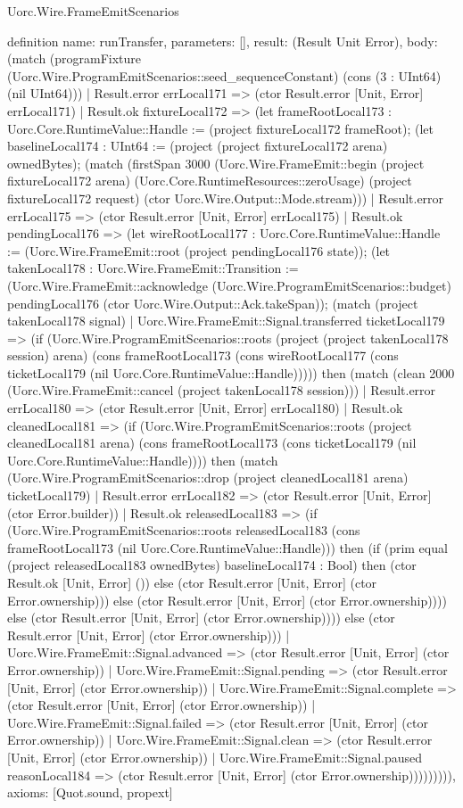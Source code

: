 \begin{lexlean}{Uorc.Wire.FrameEmitScenarios}
\begin{semanticmodule}
definition{
  name: runTransfer,
  parameters: [],
  result: (Result Unit Error),
  body: (match (programFixture (Uorc.Wire.ProgramEmitScenarios::seed_sequenceConstant) (cons (3 : UInt64) (nil UInt64)))
    | Result.error errLocal171 => (ctor Result.error [Unit, Error] errLocal171)
    | Result.ok fixtureLocal172 => (let frameRootLocal173 : Uorc.Core.RuntimeValue::Handle := (project fixtureLocal172 frameRoot); (let baselineLocal174 : UInt64 := (project (project fixtureLocal172 arena) ownedBytes); (match (firstSpan 3000 (Uorc.Wire.FrameEmit::begin (project fixtureLocal172 arena) (Uorc.Core.RuntimeResources::zeroUsage) (project fixtureLocal172 request) (ctor Uorc.Wire.Output::Mode.stream)))
      | Result.error errLocal175 => (ctor Result.error [Unit, Error] errLocal175)
      | Result.ok pendingLocal176 => (let wireRootLocal177 : Uorc.Core.RuntimeValue::Handle := (Uorc.Wire.FrameEmit::root (project pendingLocal176 state)); (let takenLocal178 : Uorc.Wire.FrameEmit::Transition := (Uorc.Wire.FrameEmit::acknowledge (Uorc.Wire.ProgramEmitScenarios::budget) pendingLocal176 (ctor Uorc.Wire.Output::Ack.takeSpan)); (match (project takenLocal178 signal)
        | Uorc.Wire.FrameEmit::Signal.transferred ticketLocal179 => (if (Uorc.Wire.ProgramEmitScenarios::roots (project (project takenLocal178 session) arena) (cons frameRootLocal173 (cons wireRootLocal177 (cons ticketLocal179 (nil Uorc.Core.RuntimeValue::Handle))))) then (match (clean 2000 (Uorc.Wire.FrameEmit::cancel (project takenLocal178 session)))
          | Result.error errLocal180 => (ctor Result.error [Unit, Error] errLocal180)
          | Result.ok cleanedLocal181 => (if (Uorc.Wire.ProgramEmitScenarios::roots (project cleanedLocal181 arena) (cons frameRootLocal173 (cons ticketLocal179 (nil Uorc.Core.RuntimeValue::Handle)))) then (match (Uorc.Wire.ProgramEmitScenarios::drop (project cleanedLocal181 arena) ticketLocal179)
            | Result.error errLocal182 => (ctor Result.error [Unit, Error] (ctor Error.builder))
            | Result.ok releasedLocal183 => (if (Uorc.Wire.ProgramEmitScenarios::roots releasedLocal183 (cons frameRootLocal173 (nil Uorc.Core.RuntimeValue::Handle))) then (if (prim equal (project releasedLocal183 ownedBytes) baselineLocal174 : Bool) then (ctor Result.ok [Unit, Error] ()) else (ctor Result.error [Unit, Error] (ctor Error.ownership))) else (ctor Result.error [Unit, Error] (ctor Error.ownership)))) else (ctor Result.error [Unit, Error] (ctor Error.ownership)))) else (ctor Result.error [Unit, Error] (ctor Error.ownership)))
        | Uorc.Wire.FrameEmit::Signal.advanced => (ctor Result.error [Unit, Error] (ctor Error.ownership))
        | Uorc.Wire.FrameEmit::Signal.pending => (ctor Result.error [Unit, Error] (ctor Error.ownership))
        | Uorc.Wire.FrameEmit::Signal.complete => (ctor Result.error [Unit, Error] (ctor Error.ownership))
        | Uorc.Wire.FrameEmit::Signal.failed => (ctor Result.error [Unit, Error] (ctor Error.ownership))
        | Uorc.Wire.FrameEmit::Signal.clean => (ctor Result.error [Unit, Error] (ctor Error.ownership))
        | Uorc.Wire.FrameEmit::Signal.paused reasonLocal184 => (ctor Result.error [Unit, Error] (ctor Error.ownership))))))))),
  axioms: [Quot.sound, propext]
}


\end{semanticmodule}
\end{lexlean}
